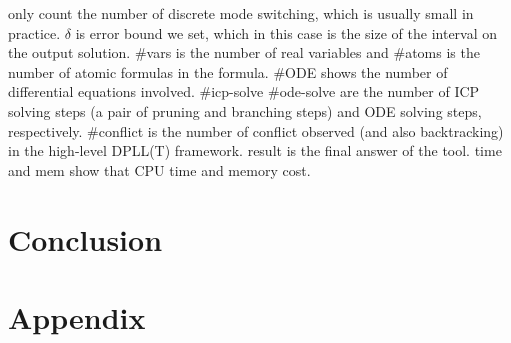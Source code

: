\documentclass[envcountsect]{llncs}
\begin{document}
only count the number of discrete mode switching, which is usually small in
practice. {\sf $\delta$} is error bound we set, which in this case is the size
of the interval on the output solution. {\sf \#vars} is the number of real
variables and {\sf \#atoms} is the number of atomic
formulas in the formula. {\sf \#ODE} shows the number of differential equations
involved. \#{\sf icp-solve} \#{ode-solve} are the number of ICP solving steps (a
pair of pruning and branching steps) and ODE solving steps, respectively.
\#{\sf conflict} is the number of conflict observed (and also backtracking) in
the high-level DPLL(T) framework. {result} is the final answer of the tool. {\sf
time} and {\sf mem} show that CPU time and memory cost. 

\section{Conclusion}








\newpage
\section*{Appendix}
\end{document}
